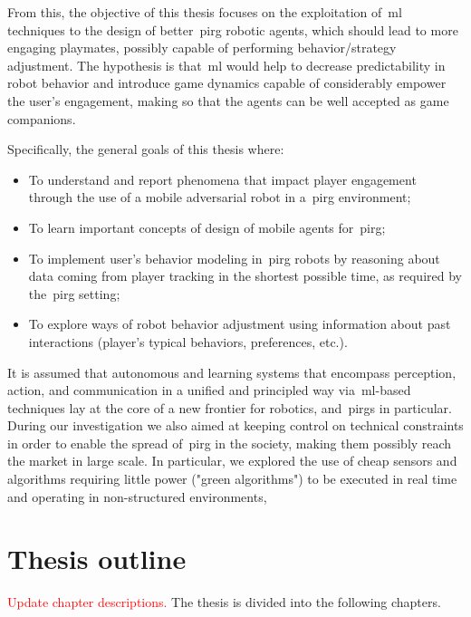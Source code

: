 From this, the objective of this thesis focuses on the exploitation of~\gls{ml} techniques to the design of better~\gls{pirg} robotic agents, which should lead to more engaging playmates, possibly capable of performing behavior/strategy adjustment. The hypothesis is that~\gls{ml} would help to decrease predictability in robot behavior and introduce game dynamics capable of considerably empower the user’s engagement, making so that the agents can be well accepted as game companions.

Specifically, the general goals of this thesis where:

\begin{itemize}
\item To understand and report phenomena that impact player engagement through the use of a mobile adversarial robot in a~\gls{pirg} environment;
\item To learn important concepts of design of mobile agents for~\gls{pirg};
\item To implement user's behavior modeling in~\gls{pirg} robots by reasoning about data coming from player tracking in the shortest possible time, as required by the~\gls{pirg} setting;
\item To explore ways of robot behavior adjustment using information about past interactions (player's typical behaviors, preferences, etc.).
\end{itemize}

It is assumed that autonomous and learning systems that encompass perception, action, and communication in a unified and principled way via~\gls{ml}-based techniques lay at the core of a new frontier for robotics, and~\gls{pirg}s in particular. During our investigation we also aimed at keeping control on technical constraints in order to enable the spread of~\gls{pirg} in the society, making them possibly reach the market in large scale. In particular, we explored the use of cheap sensors and algorithms requiring little power ("green algorithms") to be executed in real time and operating in non-structured environments, 

\section{Thesis outline}
\textcolor{red}{Update chapter descriptions.}
The thesis is divided into the following chapters.

